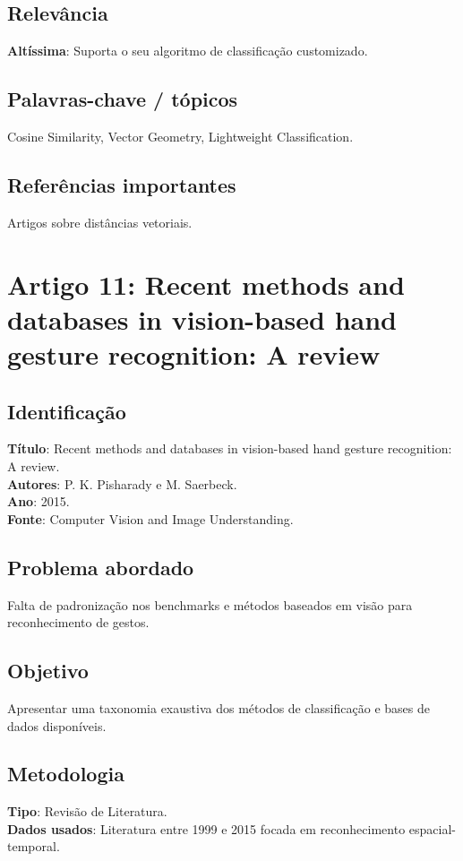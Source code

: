 \documentclass[12pt, a4paper]{article}
\begin{document}
\subsection{Relevância}
\textbf{Altíssima}: Suporta o seu algoritmo de classificação customizado.\\
\subsection{Palavras-chave / tópicos}
Cosine Similarity, Vector Geometry, Lightweight Classification.\\
\subsection{Referências importantes}
Artigos sobre distâncias vetoriais.
\newpage

\section{Artigo 11: Recent methods and databases in vision-based hand gesture recognition: A review}
\subsection{Identificação}
\textbf{Título}: Recent methods and databases in vision-based hand gesture recognition: A review.\\
\textbf{Autores}: P. K. Pisharady e M. Saerbeck.\\
\textbf{Ano}: 2015.\\
\textbf{Fonte}: Computer Vision and Image Understanding.\\
\subsection{Problema abordado}
Falta de padronização nos benchmarks e métodos baseados em visão para reconhecimento de gestos.\\
\subsection{Objetivo}
Apresentar uma taxonomia exaustiva dos métodos de classificação e bases de dados disponíveis.\\
\subsection{Metodologia}
\textbf{Tipo}: Revisão de Literatura.\\
\textbf{Dados usados}: Literatura entre 1999 e 2015 focada em reconhecimento espacial-temporal.\\
\end{document}
